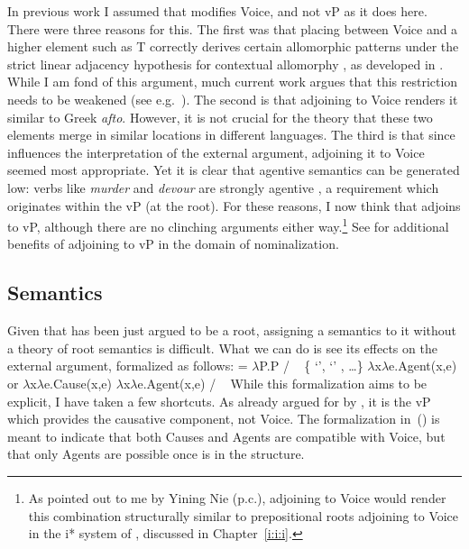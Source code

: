 {In previous work \citep{kastner16phd,kastner17gjgl,kastner18nllt} I assumed that {\va} modifies Voice, and not vP as it does here. There were three reasons for this. The first was that placing {\va} between Voice and a higher element such as T correctly derives certain allomorphic patterns under the strict linear adjacency hypothesis for contextual allomorphy \citep{embick10,marantz13}, as developed in \cite{kastner18nllt}. While I am fond of this argument, much current work argues that this restriction needs to be weakened (see e.g.~\citealt{kastnermoskal18,choiharley19}). The second is that adjoining {\va} to Voice renders it similar to Greek \emph{afto}. However, it is not crucial for the theory that these two elements merge in similar locations in different languages. The third is that since {\va} influences the interpretation of the external argument, adjoining it to Voice seemed most appropriate. Yet it is clear that agentive semantics can be generated low: verbs like \emph{murder} and \emph{devour} are strongly agentive \citep{haspelmath93,unaccusativity95,marantz97,layering15}, a requirement which originates within the vP (at the root). For these reasons, I now think that {\va} adjoins to vP, although there are no clinching arguments either way.\footnote{As pointed out to me by Yining Nie (p.c.), adjoining {\va} to Voice would render this combination structurally similar to prepositional roots adjoining to Voice in the i* system of \cite{woodmarantz17}, discussed in Chapter~\ref{i:i:i}.} See \cite{ahdout19phd} for additional benefits of adjoining {\va} to vP in the domain of nominalization.

	\subsection{Semantics} \label{voice:va:sem}
Given that {\va} has been just argued to be a root, assigning a semantics to it without a theory of root semantics is difficult. What we can do is see its effects on the external argument, formalized as follows:
\pex {} = 
	\a $\lambda$P.P \phantom{agent(x,e)xxx} / \trace~ \{  `',  `' , \dots \}
	\a $\lambda$x$\lambda$e.Agent(x,e) or $\lambda$x$\lambda$e.Cause(x,e)
	\a $\lambda$x$\lambda$e.Agent(x,e) / \trace~\va
\xe
While this formalization aims to be explicit, I have taken a few shortcuts. As already argued for by \cite{layering15}, it is the vP which provides the causative component, not Voice. The formalization in~(\lastx) is meant to indicate that both Causes and Agents are compatible with Voice, but that only Agents are possible once {\va} is in the structure. 

}

